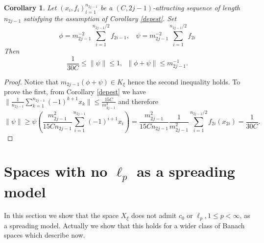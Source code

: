\documentclass[a4paper]{amsart}
\theoremstyle{plain}
\newtheorem{corollary}[theorem]{Corollary}
\newcommand{\norm}[1][\cdot]{\lVert #1\rVert}
\begin{document}
\begin{corollary}\label{c412}
Let $(x_i,f_i)_{i=1}^{n_{2j-1}}$ be a $(C,2j-1)$-attracting sequence of
length $n_{2j-1}$ satisfying the assumption of Corollary
\ref{depest}. Set
$$
\phi=m_{2j-1}^{-2}\sum\limits_{i=1}^{n_{2j-1}/2}f_{2i-1},\ \ \ \ \psi=m_{2j-1}^{-2}\sum\limits_{i=1}^{n_{2j-1}/2}f_{2i}
$$
Then
$$
\frac{1}{30C}\leq\norm[\psi]\leq 1,\,\,\,\norm[\phi+\psi]\leq
m_{2j-1}^{-1}.
$$
\end{corollary}
\begin{proof}
Notice that $m_{2j-1}(\phi+\psi)\in K_{\xi}$ hence the second
inequality holds. To prove the first, from Corollary \ref{depest} we have
$\|\frac{1}{n_{2j-1}}\sum\limits_{k=1}^{n_{2j-1}}
  (-1)^{k+1}x_k\| \leq \frac{15C}{m_{2j-1}^2}$ and therefore
$$
\norm[\psi]\geq\psi(\frac{m_{2j-1}^2}{15Cn_{2j-1}}\sum_{i=1}^{n_{2j-1}}(-1)^{i+1}x_i)
=\frac{m_{2j-1}^2}{15Cn_{2j-1}}
\frac{1}{m_{2j-1}^{2}}\sum_{i=1}^{n_{2j-1}/2}f_{2i}(x_{2i})
=\frac{1}{30C}.
$$
\end{proof}
\section{Spaces with no $\ell_{p}$ as a spreading model}
\label{sec11}
In this section we show that the space $X_{\xi}$ does not admit
$c_0$ or $\ell_{p}, 1\leq p<\infty$, as a
spreading model.
Actually we  show that  this holds   for a wider class of Banach spaces
which describe now.
\end{document}
